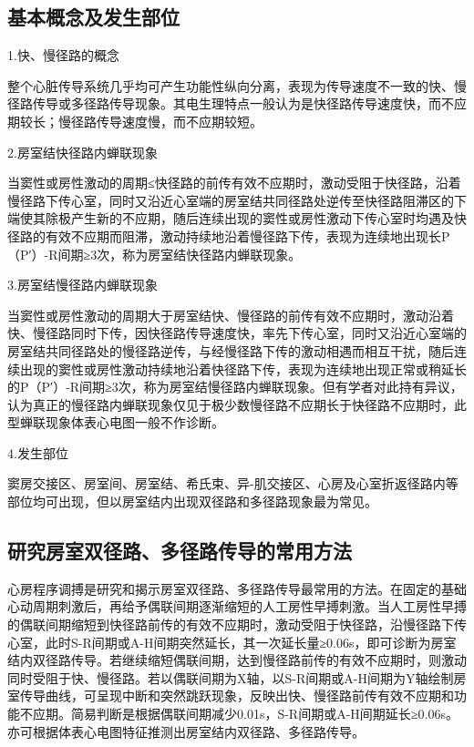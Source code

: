 \subsection{基本概念及发生部位}

1.快、慢径路的概念

整个心脏传导系统几乎均可产生功能性纵向分离，表现为传导速度不一致的快、慢径路传导或多径路传导现象。其电生理特点一般认为是快径路传导速度快，而不应期较长；慢径路传导速度慢，而不应期较短。

2.房室结快径路内蝉联现象

当窦性或房性激动的周期≤快径路的前传有效不应期时，激动受阻于快径路，沿着慢径路下传心室，同时又沿近心室端的房室结共同径路处逆传至快径路阻滞区的下端使其除极产生新的不应期，随后连续出现的窦性或房性激动下传心室时均遇及快径路的有效不应期而阻滞，激动持续地沿着慢径路下传，表现为连续地出现长P（P′）-R间期≥3次，称为房室结快径路内蝉联现象。

3.房室结慢径路内蝉联现象

当窦性或房性激动的周期大于房室结快、慢径路的前传有效不应期时，激动沿着快、慢径路同时下传，因快径路传导速度快，率先下传心室，同时又沿近心室端的房室结共同径路处的慢径路逆传，与经慢径路下传的激动相遇而相互干扰，随后连续出现的窦性或房性激动持续地沿着快径路下传，表现为连续地出现正常或稍延长的P（P′）-R间期≥3次，称为房室结慢径路内蝉联现象。但有学者对此持有异议，认为真正的慢径路内蝉联现象仅见于极少数慢径路不应期长于快径路不应期时，此型蝉联现象体表心电图一般不作诊断。

4.发生部位

窦房交接区、房室间、房室结、希氏束、异-肌交接区、心房及心室折返径路内等部位均可出现，但以房室结内出现双径路和多径路现象最为常见。

\protect\hypertarget{text00032.htmlux5cux23subid376}{}{}

\subsection{研究房室双径路、多径路传导的常用方法}

心房程序调搏是研究和揭示房室双径路、多径路传导最常用的方法。在固定的基础心动周期刺激后，再给予偶联间期逐渐缩短的人工房性早搏刺激。当人工房性早搏的偶联间期缩短到快径路前传的有效不应期时，激动受阻于快径路，沿慢径路下传心室，此时S-R间期或A-H间期突然延长，其一次延长量≥0.06s，即可诊断为房室结内双径路传导。若继续缩短偶联间期，达到慢径路前传的有效不应期时，则激动同时受阻于快、慢径路。若以偶联间期为X轴，以S-R间期或A-H间期为Y轴绘制房室传导曲线，可呈现中断和突然跳跃现象，反映出快、慢径路前传有效不应期和功能不应期。简易判断是根据偶联间期减少0.01s，S-R间期或A-H间期延长≥0.06s。亦可根据体表心电图特征推测出房室结内双径路、多径路传导。

